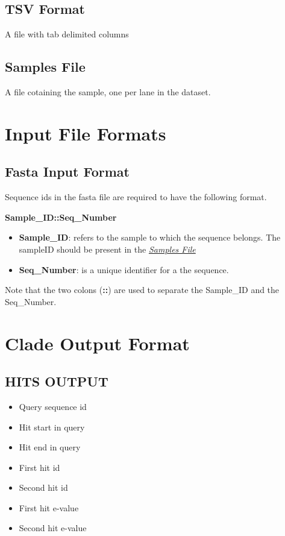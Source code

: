 \documentclass[letterpaper,10pt,english]{sphinxmanual}
\begin{document}
\subsection{TSV Format}
\label{defs:tsv}\label{defs:tsv-format}
A file with tab delimited columns


\subsection{Samples File}
\label{defs:samples-file}\label{defs:samplefile}
A file cotaining the sample, one per lane in the dataset.


\section{Input File Formats}
\label{defs:input-file-formats}

\subsection{Fasta Input Format}
\label{defs:fasta-input-format}\label{defs:inputformat}
Sequence ids in the fasta file are required to have the following format.

\textbf{Sample\_ID::Seq\_Number}
\begin{itemize}
\item {} 
\textbf{Sample\_ID}: refers to the sample to which the sequence belongs. The sampleID should be present in the {\hyperref[defs:samplefile]{\emph{Samples File}}}

\item {} 
\textbf{Seq\_Number}: is a unique identifier for a the sequence.

\end{itemize}

Note that the two colons (\textbf{::}) are used to separate the Sample\_ID and the Seq\_Number.


\section{Clade Output Format}
\label{defs:clade-output-format}

\subsection{HITS OUTPUT}
\label{defs:hitsout}\label{defs:hits-output}\begin{itemize}
\item {} 
Query sequence id

\item {} 
Hit start in query

\item {} 
Hit end in query

\item {} 
First hit id

\item {} 
Second hit id

\item {} 
First hit e-value

\item {} 
Second hit e-value

\end{itemize}
\end{document}
